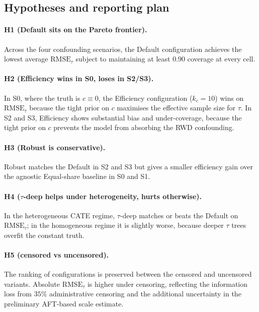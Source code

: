 \documentclass[11pt]{article}
\theoremstyle{plain}
\theoremstyle{definition}
\theoremstyle{remark}
\newcommand{\1}{\mathds{1}}
\begin{document}
\subsection{Hypotheses and reporting plan}
\label{sec:sim-prior-hypotheses}

\paragraph{H1 (Default sits on the Pareto frontier).}
Across the four confounding scenarios, the Default configuration achieves
the lowest average $\mathrm{RMSE}_\tau$ subject to maintaining at least
$0.90$ coverage at every cell.

\paragraph{H2 (Efficiency wins in S0, loses in S2/S3).}
In S0, where the truth is $c \equiv 0$, the Efficiency configuration
($k_c = 10$) wins on $\mathrm{RMSE}_\tau$ because the tight prior on $c$
maximises the effective sample size for $\tau$. In S2 and S3, Efficiency
shows substantial bias and under-coverage, because the tight
prior on $c$ prevents the model from absorbing the RWD confounding.

\paragraph{H3 (Robust is conservative).}
Robust matches the Default in S2 and S3 but gives a smaller efficiency
gain over the agnostic Equal-share baseline in S0 and S1.

\paragraph{H4 ($\tau$-deep helps under heterogeneity, hurts otherwise).}
In the heterogeneous CATE regime, $\tau$-deep matches or beats the Default
on $\mathrm{RMSE}_\tau$; in the homogeneous regime it is slightly worse,
because deeper $\tau$ trees overfit the constant truth.

\paragraph{H5 (censored vs uncensored).}
The ranking of configurations is preserved between the censored and
uncensored variants. Absolute $\mathrm{RMSE}_\tau$ is higher under
censoring, reflecting the information loss from $35\%$ administrative
censoring and the additional uncertainty in the preliminary AFT-based
scale estimate.
\end{document}
